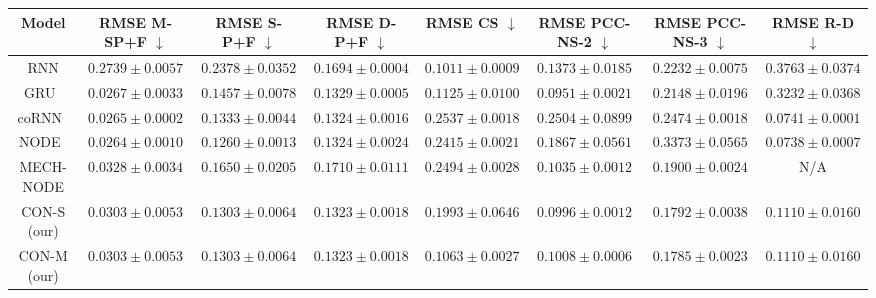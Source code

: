 \begin{landscape}
\begin{table}
    \centering
    \begin{scriptsize}
    \setlength\tabcolsep{2pt}
    \begin{tabular}{c c c c c c c c}
         \toprule
         \textbf{Model} & \textbf{RMSE M-SP+F} $\downarrow$ & \textbf{RMSE S-P+F} $\downarrow$ & \textbf{RMSE D-P+F} $\downarrow$ & \textbf{RMSE CS} $\downarrow$ & \textbf{RMSE PCC-NS-2} $\downarrow$ & \textbf{RMSE PCC-NS-3} $\downarrow$ & \textbf{RMSE R-D} $\downarrow$ \\
         \midrule
         RNN & $0.2739 \pm 0.0057$ & $0.2378 \pm 0.0352$ & $0.1694 \pm 0.0004$ & $\mathbf{0.1011 \pm 0.0009}$ & $0.1373 \pm 0.0185$ & $0.2232 \pm 0.0075$ & $0.3763 \pm 0.0374$\\
         GRU~\citep{cho2014learning} & $0.0267 \pm 0.0033$ & $0.1457 \pm 0.0078$ & $0.1329 \pm 0.0005$ & $0.1125 \pm 0.0100$ & $\mathbf{0.0951 \pm 0.0021}$ & $0.2148 \pm 0.0196$ & $0.3232 \pm 0.0368$\\
         coRNN~\citep{rusch2020coupled} & $\mathbf{0.0265 \pm 0.0002}$ & $0.1333 \pm 0.0044$ & $0.1324 \pm 0.0016$ & $0.2537 \pm 0.0018$ & $0.2504 \pm 0.0899$ & $0.2474 \pm 0.0018$ & $\mathbf{0.0741 \pm 0.0001}$\\
         NODE~\citep{chen2018neural} & $\mathbf{0.0264 \pm 0.0010}$ & $\mathbf{0.1260 \pm 0.0013}$ & $0.1324 \pm 0.0024$ & $0.2415 \pm 0.0021$ & $0.1867 \pm 0.0561$ & $0.3373 \pm 0.0565$ & $\mathbf{0.0738 \pm 0.0007}$\\
         MECH-NODE & $0.0328 \pm 0.0034$ & $0.1650 \pm 0.0205$ & $0.1710 \pm 0.0111$ & $0.2494 \pm 0.0028$ & $0.1035 \pm 0.0012$ & $0.1900 \pm 0.0024$ & N/A\\
         CON-S (our) & $0.0303 \pm 0.0053$ & $0.1303 \pm 0.0064$ & $0.1323 \pm 0.0018$ & $0.1993 \pm 0.0646$ & $0.0996 \pm 0.0012$ & $0.1792 \pm 0.0038$ & $0.1110 \pm 0.0160$\\
         CON-M (our) & $0.0303 \pm 0.0053$ & $0.1303 \pm 0.0064$ & $0.1323 \pm 0.0018$ & $0.1063 \pm 0.0027$ & $0.1008 \pm 0.0006$ & $\mathbf{0.1785 \pm 0.0023}$ & $0.1110 \pm 0.0160$\\

\end{tabular}
\end{scriptsize}
\end{table}
\end{landscape}
